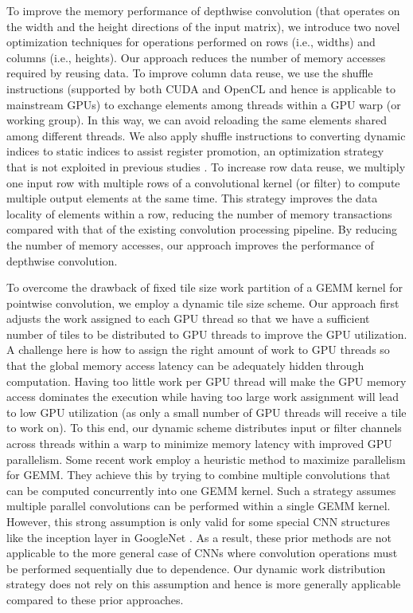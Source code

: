 To improve the memory performance of depthwise convolution (that operates on the width and the height directions of the input matrix), we
introduce two novel optimization techniques for operations performed on rows (i.e., widths) and columns (i.e., heights). Our approach
reduces the number of memory accesses required by reusing data. To improve column data reuse, we use the shuffle instructions (supported by
both CUDA and OpenCL and hence is applicable to mainstream GPUs) to exchange elements among threads within a GPU warp (or working group).
In this way, we can avoid reloading the same elements shared among different threads. We also apply shuffle instructions to converting
dynamic indices to static indices to assist register promotion, an optimization strategy that is not exploited in previous studies
\cite{vasilache2014fast}. To increase row data reuse, we multiply one input row with multiple rows of a convolutional kernel (or filter) to
compute multiple output elements at the same time. This strategy improves the data locality of elements within a row, reducing the number
of memory transactions compared with that of the existing convolution processing pipeline. By reducing the number of memory accesses, our
approach improves the performance of depthwise convolution.

To overcome the drawback of fixed tile size work partition of a GEMM kernel for pointwise convolution, we employ a dynamic tile size
scheme. Our approach first adjusts the work assigned to each GPU thread so that we have a sufficient number of tiles to be distributed to GPU
threads to improve the GPU utilization. A challenge here is how to assign the right amount of work to GPU threads so that the global memory
access latency can be adequately hidden through computation. Having too little work per GPU thread will make the GPU memory access
dominates the execution while having too large work assignment will lead to low GPU utilization (as only a small number of GPU threads will
receive a tile to work on). To this end, our dynamic scheme distributes input or filter channels across threads within a warp to minimize
memory latency with improved GPU parallelism. Some recent work \cite{li2019coordinated,pourghassemi2020limits} employ a heuristic method
to maximize parallelism for GEMM. They achieve this by trying to combine multiple convolutions that can be computed concurrently into one
GEMM kernel. Such a strategy assumes multiple parallel convolutions can be performed within a single GEMM kernel. However, this strong
assumption is only valid for some special CNN structures like the inception layer in GoogleNet \cite{szegedy2015going}. As a result, these
prior methods are not applicable to the more general case of CNNs where convolution operations must be performed sequentially due to
dependence. Our dynamic work distribution strategy does not rely on this assumption and hence is more generally applicable compared to
these prior approaches.


